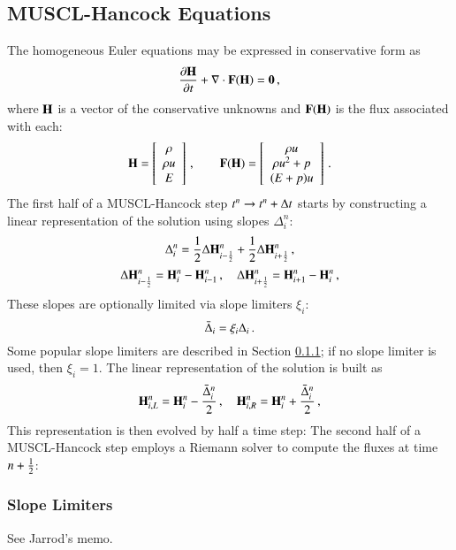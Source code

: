 \subsection{MUSCL-Hancock Equations}

The homogeneous Euler equations may be expressed in conservative form as
\begin{equation}
  \frac{\partial \mathbf{H}}{\partial t} + \nabla\cdot\mathbf{F}(\mathbf{H}) = \mathbf{0} \, ,
\end{equation}
where $\mathbf{H}$ is a vector of the conservative unknowns
and $\mathbf{F}(\mathbf{H})$ is the flux associated with each:
\begin{equation}
  \mathbf{H}=\left[\begin{array}{c}\rho\\\rho u\\E\end{array}\right] \, ,\qquad
  \mathbf{F}(\mathbf{H})=\left[\begin{array}{c}\rho u\\
  \rho u^2 + p\\
  (E+p)u\end{array}\right] \, .
\end{equation}
The first half of a MUSCL-Hancock step $t^n\rightarrow t^n+\Delta t$
starts by constructing a linear representation of the solution
using slopes $\Delta_i^n$:
\begin{equation}\label{eq:muscl_slopes}
  \Delta_i^n = \frac{1}{2}\Delta\mathbf{H}_{i-\frac{1}{2}}^n + \frac{1}{2}\Delta\mathbf{H}_{i+\frac{1}{2}}^n \, ,
\end{equation}
\begin{equation}\label{eq:muscl_differences}
  \Delta\mathbf{H}_{i-\frac{1}{2}}^n = \mathbf{H}_i^n - \mathbf{H}_{i-1}^n \, ,\quad
  \Delta\mathbf{H}_{i+\frac{1}{2}}^n = \mathbf{H}_{i+1}^n - \mathbf{H}_i^n \, ,
\end{equation}
These slopes are optionally limited via slope limiters $\xi_i$:
\begin{equation}
  \bar{\Delta}_i = \xi_i \Delta_i \, .
\end{equation}
Some popular slope limiters are described in Section \ref{sec:slope_limiters};
if no slope limiter is used, then $\xi_i=1$. The linear representation
of the solution is built as
\begin{equation}\label{eq:edge_hydro}
  \mathbf{H}_{i,L}^n = \mathbf{H}_i^n - \frac{\bar{\Delta}_i^n}{2} \, ,
  \quad
  \mathbf{H}_{i,R}^n = \mathbf{H}_i^n + \frac{\bar{\Delta}_i^n}{2} \, ,
\end{equation}
This representation is then evolved by half a time step:
The second half of a MUSCL-Hancock step employs a Riemann solver
to compute the fluxes at time $n+\frac{1}{2}$:

\subsubsection{Slope Limiters}\label{sec:slope_limiters}
See Jarrod's memo.
